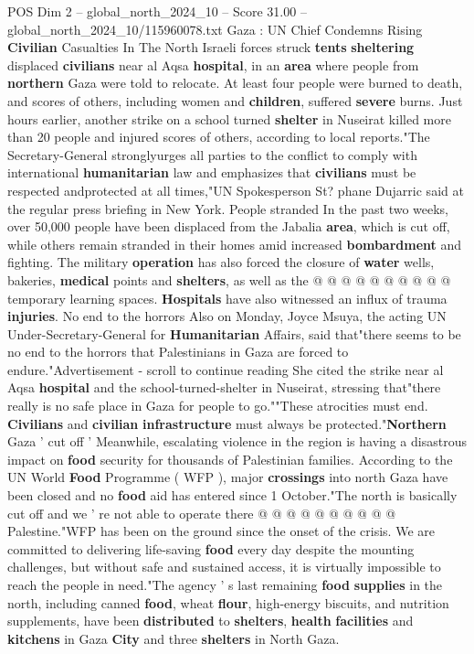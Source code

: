\begin{textsample}{POS Dim 2 – global\_north\_2024\_10 – Score 31.00 – global\_north\_2024\_10/115960078.txt}  \label{ex:f2_pos_344}
Gaza : UN Chief Condemns Rising \textbf{Civilian} Casualties In The North Israeli forces struck \textbf{tents} \textbf{sheltering} displaced \textbf{civilians} near al Aqsa \textbf{hospital}, in an \textbf{area} where people from \textbf{northern} Gaza were told to relocate.
At least four people were burned to death, and scores of others, including women and \textbf{children}, suffered \textbf{severe} burns.
Just hours earlier, another strike on a school turned \textbf{shelter} in Nuseirat killed more than 20 people and injured scores of others, according to local reports."The Secretary-General stronglyurges all parties to the conflict to comply with international \textbf{humanitarian} law and emphasizes that \textbf{civilians} must be respected andprotected at all times,"UN Spokesperson St? phane Dujarric said at the regular press briefing in New York.
People stranded In the past two weeks, over 50,000 people have been displaced from the Jabalia \textbf{area}, which is cut off, while others remain stranded in their homes amid increased \textbf{bombardment} and fighting.
The military \textbf{operation} has also forced the closure of \textbf{water} wells, bakeries, \textbf{medical} points and \textbf{shelters}, as well as the @ @ @ @ @ @ @ @ @ @ temporary learning spaces. \textbf{Hospitals} have also witnessed an influx of trauma \textbf{injuries}.
No end to the horrors Also on Monday, Joyce Msuya, the acting UN Under-Secretary-General for \textbf{Humanitarian} Affairs, said that"there seems to be no end to the horrors that Palestinians in Gaza are forced to endure."Advertisement - scroll to continue reading She cited the strike near al Aqsa \textbf{hospital} and the school-turned-shelter in Nuseirat, stressing that"there really is no safe place in Gaza for people to go.""These atrocities must end. \textbf{Civilians} and \textbf{civilian} \textbf{infrastructure} must always be protected."\textbf{Northern} Gaza ' cut off ' Meanwhile, escalating violence in the region is having a disastrous impact on \textbf{food} security for thousands of Palestinian families.
According to the UN World \textbf{Food} Programme ( WFP ), major \textbf{crossings} into north Gaza have been closed and no \textbf{food} aid has entered since 1 October."The north is basically cut off and we ' re not able to operate there @ @ @ @ @ @ @ @ @ @ Palestine."WFP has been on the ground since the onset of the crisis.
We are committed to delivering life-saving \textbf{food} every day despite the mounting challenges, but without safe and sustained access, it is virtually impossible to reach the people in need."The agency ' s last remaining \textbf{food} \textbf{supplies} in the north, including canned \textbf{food}, wheat \textbf{flour}, high-energy biscuits, and nutrition supplements, have been \textbf{distributed} to \textbf{shelters}, \textbf{health} \textbf{facilities} and \textbf{kitchens} in Gaza \textbf{City} and three \textbf{shelters} in North Gaza.

\end{textsample}
